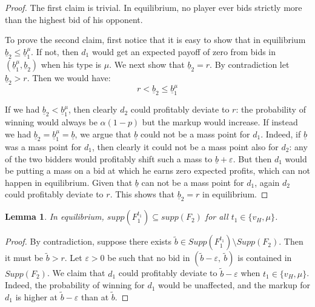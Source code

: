 \documentclass[11pt]{article}
\theoremstyle{plain}
\theoremstyle{definition}
\theoremstyle{plain}
\theoremstyle{plain}
\theoremstyle{plain}
\newtheorem{lem}[thm]{Lemma}
\theoremstyle{plain}
\numberwithin{equation}{section}
\begin{document}
\begin{proof}
The first claim is trivial. In equilibrium, no player ever bids strictly more than the highest bid of his opponent.
\vspace{2mm}

\noindent To prove the second claim, first notice that it is easy to show that in equilibrium $ \underline{b}_2 \leq \underline{b}_1^{\mu} $. If not, then $ d_1 $ would get an expected payoff of zero from bids in $ (\underline{b}_1^{\mu}, \underline{b}_2) $ when his type is $ \mu $. We next show that $ \underline{b}_2 = r $. By contradiction let $ \underline{b}_2 > r $. Then we would have:
\begin{equation*}
r < \underline{b}_2 \leq \underline{b}_1^{\mu}
\end{equation*}

\noindent If we had $ \underline{b}_2 < \underline{b}_1^{\mu} $, then clearly $ d_2 $ could profitably deviate to $ r $: the probability of winning would always be $ \alpha (1 - p) $ but the markup would increase. If instead we had $ \underline{b}_2 = \underline{b}_1^{\mu} = \underline{b} $, we argue that $ \underline b $ could not be a mass point for $ d_1 $. Indeed, if $ \underline b $ was a mass point for $ d_1 $, then clearly it could not be a mass point also for $ d_2 $: any of the two bidders would profitably shift such a mass to $ \underline{b} + \varepsilon $. But then $ d_1 $ would be putting a mass on a bid at which he earns zero expected profits, which can not happen in equilibrium. Given that $ \underline b $ can not be a mass point for $ d_1 $, again $ d_2 $ could profitably deviate to $ r $. This shows that $ \underline{b}_2 = r $ in equilibrium.
\end{proof}

\vspace{0.4cm}

\begin{lem}\label{lem:inclusion}
In equilibrium, $ supp \left( F_1^{t_1} \right) \subseteq supp \left(F_2\right) $ for all $ t_1 \in \{ v_H, \mu \} $.
\end{lem}

\begin{proof}
 By contradiction, suppose there exists $ \tilde{b} \in Supp\left(F_1^{t_1}\right) \setminus Supp(F_2) $. Then it must be $ \tilde b > r $. Let $ \varepsilon > 0 $ be such that no bid in $ (\tilde b - \varepsilon,\ \tilde b) $ is contained in $ Supp(F_2) $. We claim that $ d_1 $ could profitably deviate to $ \tilde b - \varepsilon $ when $ t_1 \in \{ v_H, \mu \} $. Indeed, the probability of winning for $ d_1 $ would be unaffected, and the markup for $ d_1 $ is higher at $ \tilde b - \varepsilon $ than at $ \tilde b $. 
\end{proof}
\end{document}
